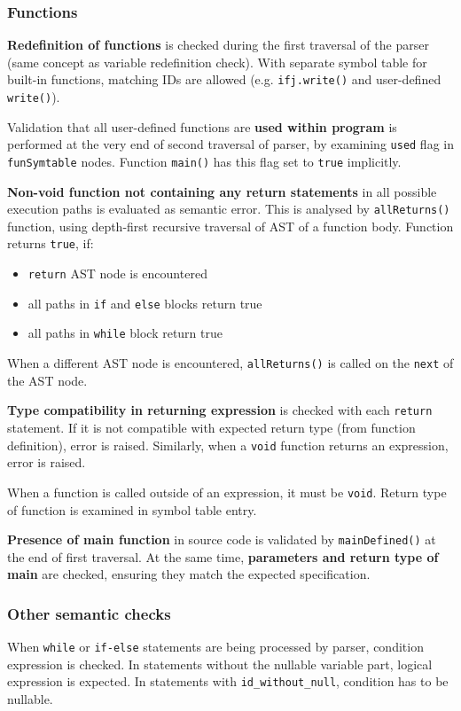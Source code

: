 \documentclass[a4paper, 11pt]{article}
\begin{document}
\subsubsection{Functions}
\textbf{Redefinition of functions} is checked during the first traversal of the parser (same concept as variable redefinition check).
With separate symbol table for built-in functions, matching IDs are allowed (e.g. \verb|ifj.write()| and user-defined \verb|write()|).
\par
Validation that all user-defined functions are \textbf{used within program} is performed at the very end of second traversal of parser,
by examining \verb|used| flag in \verb|funSymtable| nodes. Function \verb|main()| has this flag set to \verb|true| implicitly. 
\par
\textbf{Non-void function not containing any return statements} in all possible execution paths is evaluated as semantic error.
This is analysed by \verb|allReturns()| function, using depth-first recursive traversal of AST of a function body.
Function returns \verb|true|, if:
\begin{itemize}
    \item \verb|return| AST node is encountered
    \item all paths in \verb|if| and \verb|else| blocks return true
    \item all paths in \verb|while| block return true
\end{itemize}
When a different AST node is encountered, \verb|allReturns()| is called on the \verb|next| of the AST node.
\par
\textbf{Type compatibility in returning expression} is checked with each \verb|return| statement. If it is not compatible with
expected return type (from function definition), error is raised. Similarly, when a \verb|void| function returns an expression,
error is raised.
\par
When a function is called outside of an expression, it must be \verb|void|. Return type of function is examined in 
symbol table entry.
\par
\textbf{Presence of main function} in source code is validated by \verb|mainDefined()| at the end of first traversal.
At the same time, \textbf{parameters and return type of main} are checked, ensuring they match the expected specification.

\subsubsection{Other semantic checks}
When \verb|while| or \verb|if-else| statements are being processed by parser, condition expression is checked.
In statements without the nullable variable part, logical expression is expected. In statements with \verb|id_without_null|,
condition has to be nullable.
\end{document}

